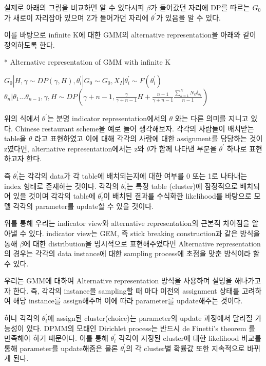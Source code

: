 \documentclass[a4paper]{oblivoir}
\begin{document}
실제로 아래의 그림을 비교하면 알 수 있다시피 $\beta$가 들어갔던 자리에 DP를 따르는 $G_{0}$가 새로이 자리잡아 있으며 Z가 들어가던 자리에 $\theta^{'}$가 있음을 알 수 있다. 

이를 바탕으로 infinite K에 대한 GMM의 alternative representation을 아래와 같이 정의하도록 한다.

* Alternative representation of GMM with infinite K
\begin{center}
$G_{0}|H,\gamma \sim DP(\gamma,H), \theta^{'}_{i}|G_{0} \sim G_{0}, X_{I}|\theta^{'}_{i} \sim F(\theta^{'}_{i})$\\
$\theta_{n}|\theta_{1}...\theta_{n-1},\gamma,H \sim DP(\gamma+n-1,\frac{\gamma}{\gamma+n-1}H + \frac{n-1}{\gamma+n-1}\frac{\sum^{K}_{k=1}N_{k}\delta_{\theta_{k}}}{n-1})$
\end{center}
위의 식에서 $\theta^{'}$는 분명 indicator representation에서의 $\theta$ 와는 다른 의미를 지니고 있다. Chinese restaurant scheme을 예로 들어 생각해보자. 각각의 사람들이 배치받는 table을 $\theta$ 라고 표현하였고 이에 대해 각각의 사람에 대한 assignment를 담당하는 것이 z였다면, alternative representation에서는 z와 $\theta$가 함께 나타낸 부분을 $\theta^{'}$ 하나로 표현하고자 한다. 

즉 $\theta^{'}_{i}$는 각각의 data가 각 table에 배치되는지에 대한 여부를 0 또는 1로 나타내는 index 형태로 존재하는 것이다. 각각의 $\theta^{'}_{i}$는 특정 table (cluster)에 잠정적으로 배치되어 있을 것이며 각각의 table에 $\theta^{'}_{i}$이 배치된 결과를 수식화한 likelihood를 바탕으로 모델 각각의 parameter를 update할 수 있을 것이다. 

위를 통해 우리는 indicator view와 alternative representation의 근본적 차이점을 알아낼 수 있다. indicator view는 GEM, 즉 stick breaking construction과 같은 방식을 통해 $\beta$에 대한 distribution을 명시적으로 표현해주었다면 Alternative representation의 경우는 각각의 data instance에 대한 sampling process에 초점을 맞춘 방식이라 할 수 있다. 

우리는 GMM에 대하여 Alternative representation 방식을 사용하며 설명을 해나가고자 한다. 즉, 각각의 instance을 sampling할 때 마다 이전의 assignment 상태를 고려하여 해당 instance를 assign해주며 이에 따라 parameter를 update해주는 것이다. 

허나 각각의 $\theta^{'}_{i}$에 assign된 cluster(choice)는 parameter의 update 과정에서 달라질 가능성이 있다. DPMM의 모태인 Dirichlet process는 반드시 de Finetti's theorem 를 만족해야 하기 때문이다. 이를 통해 $\theta^{'}_{i}$ 각각이 지정된 cluster에 대한 likelihood 비교를 통해 parameter를 update해줌은 물론 $\theta^{'}_{i}$의 각 cluster별 확률값 또한 지속적으로 바뀌게 된다. 
\end{document}
